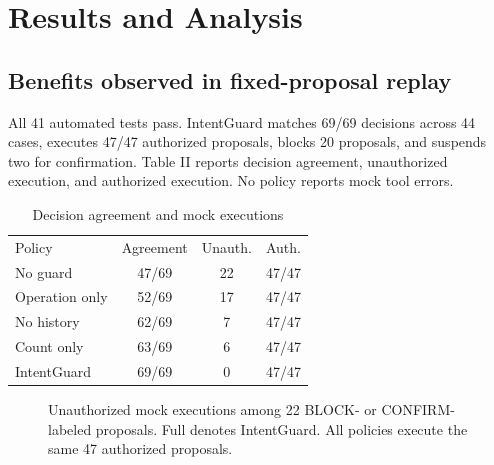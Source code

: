 \documentclass[conference,letterpaper]{IEEEtran}
\begin{document}
\section{Results and Analysis}

\subsection{Benefits observed in fixed-proposal replay}

All 41 automated tests pass. IntentGuard matches 69/69 decisions across 44 cases, executes 47/47 authorized proposals, blocks 20 proposals, and suspends two for confirmation. Table II reports decision agreement, unauthorized execution, and authorized execution. No policy reports mock tool errors.


\begin{table}[ht]
\caption{Decision agreement and mock executions}\centering\scriptsize
\begin{tabular}{lccc}\hline
Policy & Agreement & Unauth. & Auth. \\
No guard & 47/69 & 22 & 47/47 \\
Operation only & 52/69 & 17 & 47/47 \\
No history & 62/69 & 7 & 47/47 \\
Count only & 63/69 & 6 & 47/47 \\
IntentGuard & 69/69 & 0 & 47/47 \\\hline
\end{tabular}\end{table}


\begin{figure}[ht]
\centering
{}
\caption{Unauthorized mock executions among 22 BLOCK- or CONFIRM-labeled proposals. Full denotes IntentGuard. All policies execute the same 47 authorized proposals.}
\end{figure}
\end{document}
